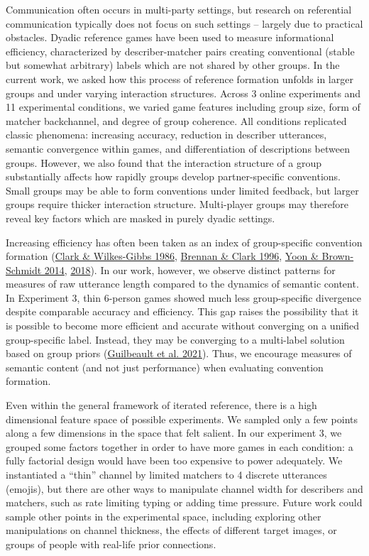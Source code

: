 \documentclass[
  english,
]{article}
\begin{document}
Communication often occurs in multi-party settings, but research on referential communication typically does not focus on such settings -- largely due to practical obstacles.
Dyadic reference games have been used to measure informational efficiency, characterized by describer-matcher pairs creating conventional (stable but somewhat arbitrary) labels which are not shared by other groups.
In the current work, we asked how this process of reference formation unfolds in larger groups and under varying interaction structures.
Across 3 online experiments and 11 experimental conditions, we varied game features including group size, form of matcher backchannel, and degree of group coherence.
All conditions replicated classic phenomena: increasing accuracy, reduction in describer utterances, semantic convergence within games, and differentiation of descriptions between groups.
However, we also found that the interaction structure of a group substantially affects how rapidly groups develop partner-specific conventions.
Small groups may be able to form conventions under limited feedback, but larger groups require thicker interaction structure.
Multi-player groups may therefore reveal key factors which are masked in purely dyadic settings.

Increasing efficiency has often been taken as an index of group-specific convention formation (\protect\hyperlink{ref-clark1986}{Clark \& Wilkes-Gibbs 1986}, \protect\hyperlink{ref-brennan1996}{Brennan \& Clark 1996}, \protect\hyperlink{ref-yoon2014}{Yoon \& Brown-Schmidt 2014}, \protect\hyperlink{ref-yoon2018}{2018}).
In our work, however, we observe distinct patterns for measures of raw utterance length compared to the dynamics of semantic content.
In Experiment 3, thin 6-person games showed much less group-specific divergence despite comparable accuracy and efficiency.
This gap raises the possibility that it is possible to become more efficient and accurate without converging on a unified group-specific label.
Instead, they may be converging to a multi-label solution based on group priors (\protect\hyperlink{ref-guilbeault2021}{Guilbeault et al. 2021}).
Thus, we encourage measures of semantic content (and not just performance) when evaluating convention formation.

Even within the general framework of iterated reference, there is a high dimensional feature space of possible experiments. We sampled only a few points along a few dimensions in the space that felt salient. In our experiment 3, we grouped some factors together in order to have more games in each condition: a fully factorial design would have been too expensive to power adequately. We instantiated a ``thin'' channel by limited matchers to 4 discrete utterances (emojis), but there are other ways to manipulate channel width for describers and matchers, such as rate limiting typing or adding time pressure. Future work could sample other points in the experimental space, including exploring other manipulations on channel thickness, the effects of different target images, or groups of people with real-life prior connections.
\end{document}
